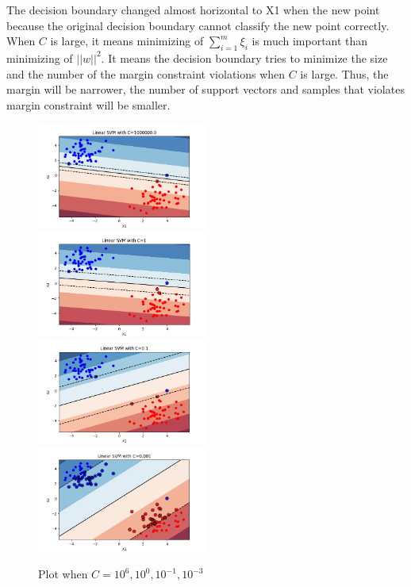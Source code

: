 \documentclass[a4paper]{article}
\begin{document}
\noindent
The decision boundary changed almost horizontal to X1 when the new point because
the original decision boundary cannot classify the new point correctly.\\
When $C$ is large, it means minimizing of $\sum_{i=1}^{m}\xi_i$ is much important
than minimizing of $||w||^2$. It means the decision boundary tries to minimize
the size and the number of the margin constraint violations when $C$ is large.
Thus, the margin will be narrower, the number of support vectors and samples
that violates margin constraint will be smaller.

\clearpage

\begin{figure}[h]
  \begin{center}
    \includegraphics[width=0.5\textwidth]{1_c_6.png}
    \includegraphics[width=0.5\textwidth]{1_c_0.png}
    \includegraphics[width=0.5\textwidth]{1_c_-1.png}
    \includegraphics[width=0.5\textwidth]{1_c_-3.png}
    \caption{Plot when $C=10^6, 10^0, 10^{-1}, 10^{-3}$}
  \end{center}
\end{figure}
\end{document}
